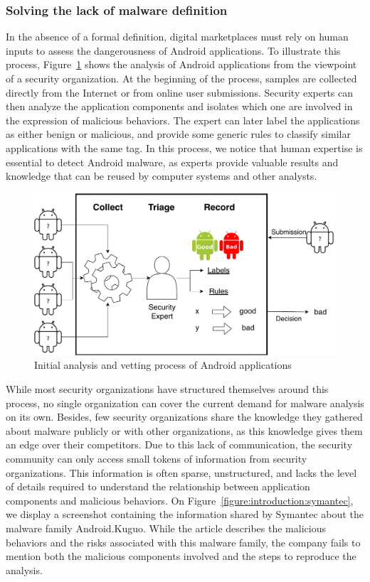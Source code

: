 \subsubsection{Solving the lack of malware definition}
In the absence of a formal definition, digital marketplaces must rely on human inputs to assess the dangerousness of Android applications.
To illustrate this process, Figure~\ref{figure:introduction:antivirus} shows the analysis of Android applications from the viewpoint of a security organization.
At the beginning of the process, samples are collected directly from the Internet or from online user submissions.
Security experts can then analyze the application components and isolates which one are involved in the expression of malicious behaviors.
The expert can later label the applications as either benign or malicious, and provide some generic rules to classify similar applications with the same tag.
In this process, we notice that human expertise is essential to detect Android malware, as experts provide valuable results and knowledge that can be reused by computer systems and other analysts.

\begin{figure}[!ht]
	\centering
	\includegraphics[width=\linewidth]{figures/introduction/antivirus.pdf}
	\caption{Initial analysis and vetting process of Android applications}
	\label{figure:introduction:antivirus}
\end{figure}

While most security organizations have structured themselves around this process, no single organization can cover the current demand for malware analysis on its own.
Besides, few security organizations share the knowledge they gathered about malware publicly or with other organizations, as this knowledge gives them an edge over their competitors.
Due to this lack of communication, the security community can only access small tokens of information from security organizations.
This information is often sparse, unstructured, and lacks the level of details required to understand the relationship between application components and malicious behaviors.
On Figure~\ref{figure:introduction:symantec}, we display a screenshot containing the information shared by Symantec about the malware family Android.Kuguo.
While the article describes the malicious behaviors and the risks associated with this malware family, the company fails to mention both the malicious components involved and the steps to reproduce the analysis.

